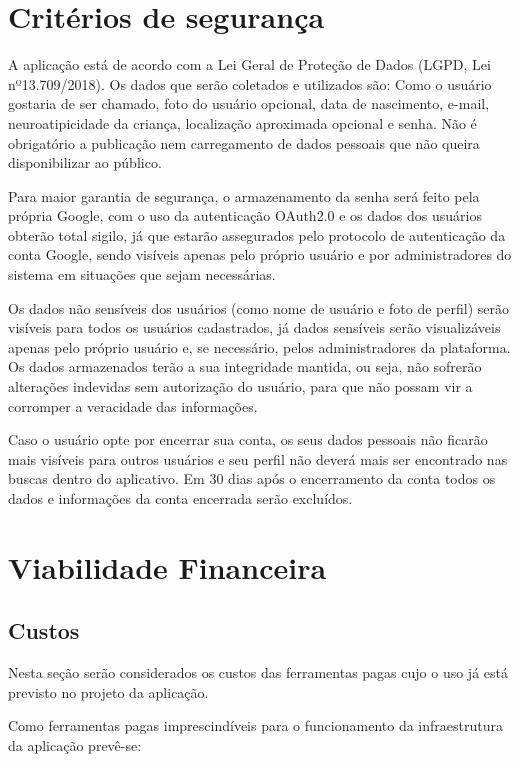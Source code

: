 \section{Critérios de segurança}


A aplicação está de acordo com a Lei Geral de Proteção de Dados (LGPD, Lei nº13.709/2018). Os dados que serão coletados e utilizados são: Como o usuário gostaria de ser chamado, foto do usuário opcional, data de nascimento, e-mail, neuroatipicidade da criança, localização aproximada opcional e senha. Não é obrigatório a publicação nem carregamento de dados pessoais que não queira disponibilizar ao público. 

Para maior garantia de segurança, o armazenamento da senha será feito pela própria Google, com o uso da autenticação OAuth2.0 e os dados dos usuários obterão total sigilo, já que estarão assegurados pelo protocolo de autenticação da conta Google, sendo visíveis apenas pelo próprio usuário e por administradores do sistema em situações que sejam necessárias. 

Os dados não sensíveis dos usuários (como nome de usuário e foto de perfil) serão visíveis para todos os usuários cadastrados, já dados sensíveis serão visualizáveis apenas pelo próprio usuário e, se necessário, pelos administradores da plataforma. Os dados armazenados terão a sua integridade mantida, ou seja, não sofrerão alterações indevidas sem autorização do usuário, para que não possam vir a corromper a veracidade das informações. 

Caso o usuário opte por encerrar sua conta, os seus dados pessoais não ficarão mais visíveis para outros usuários e seu perfil não deverá mais ser encontrado nas buscas dentro do aplicativo. Em 30 dias após o encerramento da conta todos os dados e informações da conta encerrada serão excluídos. 

\section{Viabilidade Financeira}


\subsection{Custos}
Nesta seção serão considerados os custos das ferramentas pagas cujo o uso já está previsto no projeto da aplicação. 

Como ferramentas pagas imprescindíveis para o funcionamento da infraestrutura da aplicação prevê-se:

